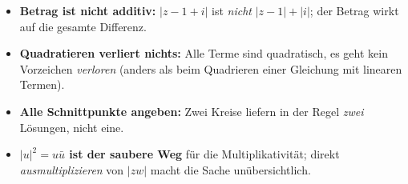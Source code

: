 \begin{achtung}
\begin{itemize}
  \item \textbf{Betrag ist nicht additiv:} $|z-1+i|$ ist \emph{nicht}
        $|z-1|+|i|$; der Betrag wirkt auf die gesamte Differenz.
  \item \textbf{Quadratieren verliert nichts:} Alle Terme sind quadratisch,
        es geht kein Vorzeichen \emph{verloren} (anders als beim Quadrieren
        einer Gleichung mit linearen Termen).
  \item \textbf{Alle Schnittpunkte angeben:} Zwei Kreise liefern in der
        Regel \emph{zwei} Lösungen, nicht eine.
  \item \textbf{$|u|^2=u\bar u$ ist der saubere Weg} für die
        Multiplikativität; direkt \emph{ausmultiplizieren} von $|zw|$ macht die
        Sache unübersichtlich.
\end{itemize}
\end{achtung}
